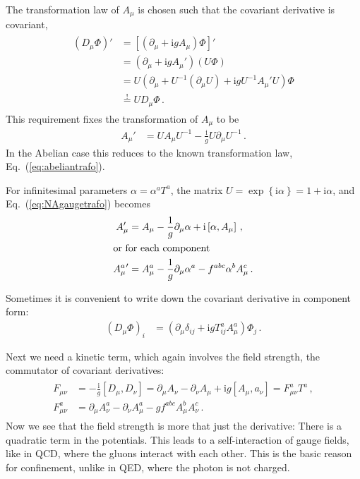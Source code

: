 \documentclass[12pt]{report}
\renewcommand{\i}{\ensuremath{\text{i}}}
\newcommand{\2}{\ensuremath{\sqrt{2}\,}}
\begin{document}
{      The transformation law of $A_\mu$ is chosen such that the covariant derivative is covariant,
      \begin{align}
        \begin{split}
          \left(D_\mu \Phi\right)' &= \left[\left(\partial_\mu + \i g A_\mu\right)\Phi\right]'\\
          &=\left(\partial_\mu + \i g A_\mu'\right)\left(U \Phi\right)\\
          &= U\left(\partial_\mu +U^{-1} \left(\partial_\mu U\right) + \i g U^{-1} A_\mu' U\right) \Phi\\
          &\stackrel{!}{=} U D_\mu \Phi\,.
        \end{split}
      \end{align}
      This requirement fixes the transformation of $A_\mu$ to be 
      \begin{align}\label{eq:NAgaugetrafo}
        A_\mu'&= U A_\mu U^{-1} -\frac{\i}{g} U\partial_\mu U^{-1}\,.
      \end{align}
      In the Abelian case this reduces to the known transformation law, Eq.~(\ref{eq:abeliantrafo}).
      
      For infinitesimal parameters $\alpha=\alpha^a T^a$, the matrix
      $U=\exp\!\left\{\i\alpha\right\}=1+\i \alpha$, and Eq.~(\ref{eq:NAgaugetrafo}) becomes
      \begin{align}
        A_\mu'&= A_\mu -\frac{1}{g} \partial_\mu \alpha +\i\left[\alpha,A_\mu\right]\,,\\
        \intertext{or for each component}
        {A_\mu^a}'&= A_\mu^a- \frac{1}{g} \partial_\mu \alpha^a - f^{abc} \alpha^b A_\mu^c\,.
      \end{align}
      
      Sometimes it is convenient to write down the covariant derivative in component form:
      \begin{align}
        \left(D_\mu \Phi\right)_i &= \left(\partial_\mu\delta_{ij} +\i g T^a_{ij} A_\mu ^a\right)
        \Phi_j \,.
      \end{align}
      
      Next we need a kinetic term, which again involves the field strength, the commutator of
      covariant derivatives:
      \begin{align}
        \begin{split}
          F_{\mu\nu} &= -\frac{\i}{g} \left[ D_\mu, D_\nu\right] = \partial_\mu A_\nu
          -\partial_\nu A_\mu +\i g \left[A_\mu,a_\nu\right]= F_{\mu\nu}^a T^a\,,\\
          F_{\mu\nu}^a&= \partial_\mu A_\nu^a -\partial_\nu A_\mu^a -g f^{abc}
          A_\mu^b A_\nu^c\,.
        \end{split}
      \end{align}
      Now we see  that the field strength is more that just the derivative: There is a quadratic
      term in the potentials.  This leads to a self-interaction of gauge fields, like in QCD,
      where the gluons interact with each other. This is the basic reason for confinement, unlike
      in QED, where the photon is not charged.
      
}
\end{document}
